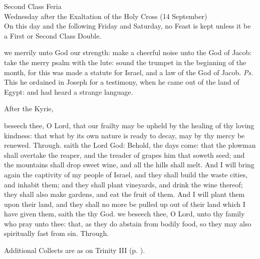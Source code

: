 \begin{inhead}
    {Second Class Feria\\
Wednesday after the Exaltation of the Holy Cross (14 September)\\
On this day and the following Friday and Saturday, no Feast is kept unless it be a First or Second Class Double.}
\end{inhead}
\par\noindent
{}
\introit
{} we merrily unto God our strength: make a cheerful noise unto the God of Jacob: take the merry psalm with the lute: sound the trumpet in the beginning of the month, for this was made a statute for Israel, and a law of the God of Jacob. \textit{Ps.} This he ordained in Joseph for a testimony, when he came out of the land of Egypt: and had heard a strange language.
\begin{rubric}
    After the Kyrie,
\end{rubric}
\collect
{} beseech thee, O Lord, that our frailty may be upheld by the healing of thy loving kindness: that what by its own nature is ready to decay, may by thy mercy be renewed. Through.
 saith the Lord God: Behold, the days come: that the plowman shall overtake the reaper, and the treader of grapes him that soweth seed; and the mountains shall drop sweet wine, and all the hills shall melt. And I will bring again the captivity of my people of Israel, and they shall build the waste cities, and inhabit them; and they shall plant vineyards, and drink the wine thereof; they shall also make gardens, and eat the fruit of them. And I will plant them upon their land, and they shall no more be pulled up out of their land which I have given them, saith the  thy God.
\collect
{} we beseech thee, O Lord, unto thy family who pray unto thee: that, as they do abstain from bodily food, so they may also spiritually fast from sin. Through.
\begin{rubric}
    Additional Collects are as on Trinity III (p. \pageref{TrinityIII}).
\end{rubric}

